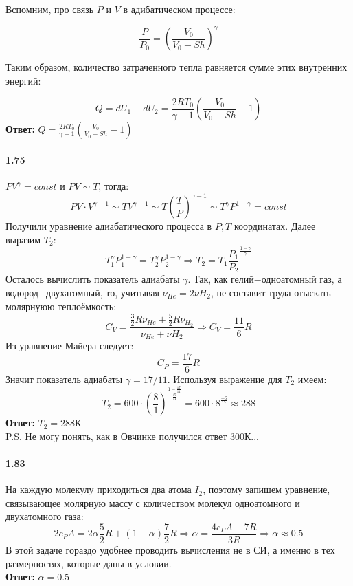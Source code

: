\documentclass{article}
\begin{document}
Вспомним, про связь $P$ и $V$ в адибатическом процессе:

\begin{displaymath}
\frac {P}{P_{0}}=(\frac{V_{0}}{V_{0}-Sh})^{\gamma}
\end{displaymath}

Таким образом, количество затраченного тепла равняется сумме этих внутренних энергий:

\begin{displaymath}
Q=dU_{1}+dU_{2}=\frac{2RT_{0}}{\gamma-1}(\frac{V_{0}}{V_{0}-Sh}-1)
\end{displaymath}
\textbf{Ответ:} $Q=\frac{2RT_{0}}{\gamma-1}(\frac{V_{0}}{V_{0}-Sh}-1)$


\paragraph{1.75}
\par $PV^\gamma=const$ и $PV\sim T$, тогда:
\begin{displaymath}
PV\cdot V^{\gamma-1}\sim TV^{\gamma-1}\sim T(\frac TP)^{\gamma-1}\sim T^\gamma P^{1-\gamma}=const
\end{displaymath}
Получили уравнение адиабатического процесса в $P, T$ координатах. Далее выразим $T_{2}$:
\begin{displaymath}
T_{1}^{\gamma}P_{1}^{1-\gamma}=T_{2}^{\gamma}P_{2}^{1-\gamma}\Rightarrow T_{2}=T_{1}\frac{P_{1}}{P_{2}}^{\frac{1-\gamma}{\gamma}}
\end{displaymath}
Осталось вычислить показатель адиабаты $\gamma$. Так, как гелий$-$одноатомный газ, а водород$-$двухатомный, то, учитывая $\nu_{He}=2\nu{H_{2}}$, не составит труда отыскать молярнуюю теплоёмкость:
\begin{displaymath}
C_{V}=\frac{\frac32R\nu_{He} + \frac52R\nu_{H_{2}}}{\nu_{He}+\nu{H_{2}}}\Rightarrow C_{V}=\frac{11}{6}R
\end{displaymath}
Из уравнение Майера следует: \begin{displaymath}C_{P}=\frac{17}{6}R\end{displaymath}Значит показатель адиабаты $\gamma=17/11$. Используя выражение для $T_{2}$ имеем:
\begin{displaymath}
T_{2}=600\cdot(\frac81)^{\frac{1-\frac{17}{11}}{\frac{17}{11}}}=600\cdot8^{\frac{-6}{17}}\approx288
\end{displaymath}
\textbf{Ответ:} $T_{2}=288$К\\
P.S. Не могу понять, как в Овчинке получился ответ 300К... 


\paragraph{1.83}
\par На каждую молекулу приходиться два атома $I_{2}$, поэтому запишем уравнение, связывающее молярную массу с количеством молекул одноатомного и двухатомного газа:
\begin{displaymath}
2c_{P}A=2\alpha\frac52R + (1-\alpha)\frac72R\Rightarrow \alpha=\frac{4c_{P}A-7R}{3R}\Rightarrow \alpha\approx0.5
\end{displaymath}
В этой задаче гораздо удобнее проводить вычисления не в СИ, а именно в тех размерностях, которые даны в условии.\\
\textbf{Ответ:} $\alpha=0.5$
\end{document}
